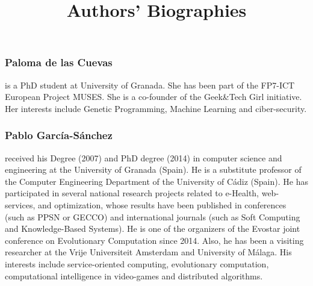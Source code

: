 \documentclass{article}
\begin{document}
\title{Authors' Biographies}


\maketitle



\subsubsection*{Paloma de las Cuevas} is a PhD student at University of Granada. She has been part of the FP7-ICT European Project MUSES. She is a co-founder of the Geek\&Tech Girl initiative. Her interests include Genetic Programming, Machine Learning and ciber-security.

\subsubsection*{Pablo Garc\'ia-S\'anchez} received his Degree (2007) and PhD degree (2014) in computer science and engineering at the University of Granada (Spain). He is a substitute professor of the Computer Engineering Department of the University of C\'adiz (Spain). He has participated in several national research projects related to e-Health, web-services, and optimization, whose results have been published in conferences (such as PPSN or GECCO) and international journals (such as Soft Computing and Knowledge-Based Systems). He is one of the organizers of the Evostar joint conference on Evolutionary Computation since 2014. Also, he has been a visiting researcher at the Vrije Universiteit Amsterdam and University of M\'alaga. His interests include service-oriented computing, evolutionary computation, computational intelligence in video-games and distributed algorithms.
\end{document}
